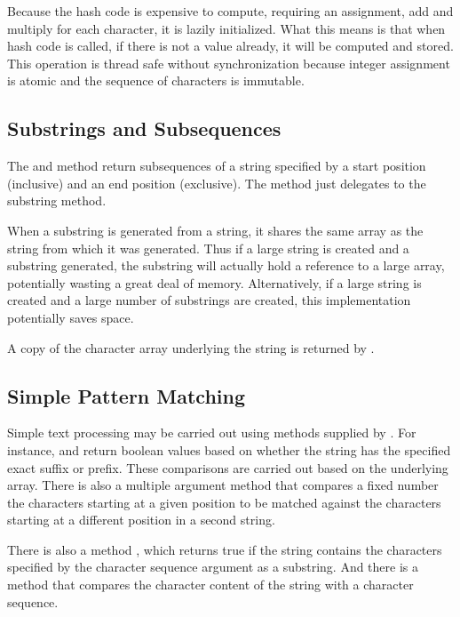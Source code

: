 Because the hash code is expensive to compute, requiring an
assignment, add and multiply for each character, it is lazily
initialized.  What this means is that when hash code is called, if
there is not a value already, it will be computed and stored. This
operation is thread safe without synchronization because integer
assignment is atomic and the sequence of characters is immutable.

\subsection{Substrings and Subsequences}

The  and method return subsequences of a
string specified by a start position (inclusive) and an end position
(exclusive).  The  method just delegates to
the substring method.

When a substring is generated from a string, it shares the same array
as the string from which it was generated.  Thus if a large string is
created and a substring generated, the substring will actually hold a
reference to a large array, potentially wasting a great deal of
memory.  Alternatively, if a large string is created and a large
number of substrings are created, this implementation potentially
saves space.

A copy of the character array underlying the string is returned
by .  

\subsection{Simple Pattern Matching}

Simple text processing may be carried out using methods supplied
by .  For instance,  and
 return boolean values based on whether
the string has the specified exact suffix or prefix.  These
comparisons are carried out based on the underlying 
array.  There is also a multiple argument 
method that compares a fixed number the characters starting at a given
position to be matched against the characters starting at a different
position in a second string.

There is also a method , which returns
true if the string contains the characters specified by the character
sequence argument as a substring.  And there is a method
 that compares the character content
of the string with a character sequence.

